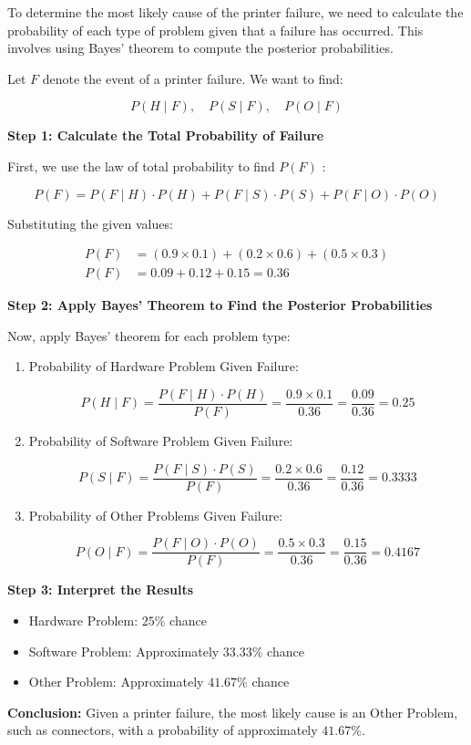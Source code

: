 \begin{solution}
    To determine the most likely cause of the printer failure, we need to calculate the probability of each type of problem given that a failure has occurred. This involves using Bayes' theorem to compute the posterior probabilities.

Let $F$ denote the event of a printer failure. We want to find:

\[
P(H \mid F), \quad P(S \mid F), \quad P(O \mid F)
\]

\textbf{Step 1: Calculate the Total Probability of Failure
}

First, we use the law of total probability to find $P(F)$ :

\[
P(F) = P(F \mid H) \cdot P(H) + P(F \mid S) \cdot P(S) + P(F \mid O) \cdot P(O)
\]

Substituting the given values:

\[
\begin{aligned}
P(F) &= (0.9 \times 0.1) + (0.2 \times 0.6) + (0.5 \times 0.3) \\
P(F) &= 0.09 + 0.12 + 0.15 = 0.36
\end{aligned}
\]

\textbf{Step 2: Apply Bayes' Theorem to Find the Posterior Probabilities
}

Now, apply Bayes' theorem for each problem type:

\begin{enumerate}
    \item Probability of Hardware Problem Given Failure: \vspace{10pt}

    \[
    P(H \mid F)=\frac{P(F \mid H) \cdot P(H)}{P(F)}=\frac{0.9 \times 0.1}{0.36}=\frac{0.09}{0.36}=0.25
    \]
    \vspace{10pt}
    \item Probability of Software Problem Given Failure: \vspace{10pt}

    \[
    P(S \mid F)=\frac{P(F \mid S) \cdot P(S)}{P(F)}=\frac{0.2 \times 0.6}{0.36}=\frac{0.12}{0.36}=0.3333
    \]
    \vspace{10pt}
    \item Probability of Other Problems Given Failure: \vspace{10pt}

    \[
    P(O \mid F)=\frac{P(F \mid O) \cdot P(O)}{P(F)}=\frac{0.5 \times 0.3}{0.36}=\frac{0.15}{0.36}=0.4167
    \]
    \vspace{10pt}
\end{enumerate}

\textbf{Step 3: Interpret the Results}
\begin{itemize}
    \item Hardware Problem: $25 \%$ chance
    \item Software Problem: Approximately $33.33 \%$ chance
    \item Other Problem: Approximately $41.67 \%$ chance
\end{itemize}

\textbf{Conclusion:} Given a printer failure, the most likely cause is an Other Problem, such as connectors, with a probability of approximately $41.67 \%$.
\leavevmode\end{solution}
